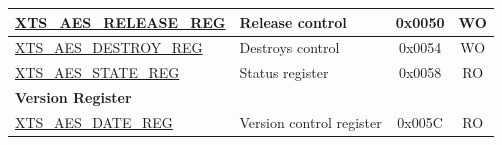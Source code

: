 \begin{longtable}{ | p{6.0cm} | p{6.6cm} | c | c| }
\hyperref[regdesc:XTSAESRELEASEREG]        {XTS\_AES\_RELEASE\_REG          }  & Release control         & 0x0050 & WO \\\hline
\hyperref[regdesc:XTSAESDESTROYREG]        {XTS\_AES\_DESTROY\_REG          }  & Destroys control         & 0x0054 & WO \\\hline
\hyperref[regdesc:XTSAESSTATEREG]          {XTS\_AES\_STATE\_REG            }  & Status register       & 0x0058 & RO \\\hline
\multicolumn{4}{|l|}{\textbf{Version Register}} \\ \hline
\hyperref[regdesc:XTSAESDATEREG]           {XTS\_AES\_DATE\_REG             }  & Version control register   & 0x005C & RO \\\hline

\end{longtable}
